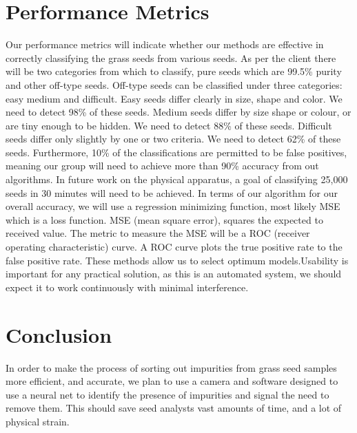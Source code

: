 \documentclass[onecolumn, draftclsnofoot,10pt, compsoc]{IEEEtran}
\begin{document}
\section{Performance Metrics}

Our performance metrics will indicate whether our methods are effective in correctly classifying the grass seeds from various seeds. As per the client there will be two categories from which to classify, pure seeds which are 99.5\% purity and other off-type seeds. Off-type seeds can be classified under three categories: easy medium and difficult. Easy seeds differ clearly in size, shape and color. We need to detect 98\% of these seeds. Medium seeds differ by size shape or colour, or are tiny enough to be hidden. We need to detect 88\% of these seeds. Difficult seeds differ only slightly by one or two criteria. We need to detect 62\% of these seeds.
Furthermore, 10\% of the classifications are permitted to be false positives, meaning our group will need to achieve more than 90\% accuracy from out algorithms. In future work on the physical apparatus, a goal of classifying 25,000 seeds in 30 minutes will need to be achieved. In terms of our algorithm for our overall accuracy, we will use a regression minimizing function, most likely MSE which is a loss function. MSE (mean square error), squares the expected to received value. The metric to measure the MSE will be a ROC (receiver operating characteristic) curve. A ROC curve plots the true positive rate to the false positive rate. These methods allow us to select optimum models.Usability is important for any practical solution, as this is an automated system, we should expect it to work continuously with minimal interference.  

\section{Conclusion}
In order to make the process of sorting out impurities from grass seed samples more efficient, and accurate, we plan to use a camera and software designed to use a neural net to identify the presence of impurities and signal the need to remove them. This should save seed analysts vast amounts of time, and a lot of physical strain. 
\end{document}
